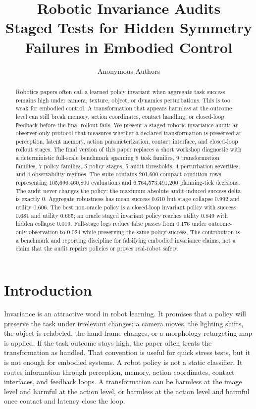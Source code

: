 \documentclass{article}
\title{Robotic Invariance Audits\\Staged Tests for Hidden Symmetry Failures in Embodied Control}
\author{Anonymous Authors}
\begin{document}
\maketitle

\begin{abstract}
Robotics papers often call a learned policy invariant when aggregate task success remains high under camera, texture, object, or dynamics perturbations. This is too weak for embodied control. A transformation that appears harmless at the outcome level can still break memory, action coordinates, contact handling, or closed-loop feedback before the final rollout fails. We present a staged robotic invariance audit: an observer-only protocol that measures whether a declared transformation is preserved at perception, latent memory, action parameterization, contact interface, and closed-loop rollout stages. The final version of this paper replaces a short workshop diagnostic with a deterministic full-scale benchmark spanning 8 task families, 9 transformation families, 7 policy families, 5 policy stages, 5 audit thresholds, 4 perturbation severities, and 4 observability regimes. The suite contains 201,600 compact condition rows representing 105,696,460,800 evaluations and 6,764,573,491,200 planning-tick decisions. The audit never changes the policy: the maximum absolute audit-induced success delta is exactly 0. Aggregate robustness has mean success 0.610 but stage collapse 0.992 and utility 0.606. The best non-oracle policy is a closed-loop invariant policy with success 0.681 and utility 0.665; an oracle staged invariant policy reaches utility 0.849 with hidden collapse 0.019. Full-stage logs reduce false passes from 0.176 under outcome-only observation to 0.024 while preserving the same policy success. The contribution is a benchmark and reporting discipline for falsifying embodied invariance claims, not a claim that the audit repairs policies or proves real-robot safety.
\end{abstract}

\section{Introduction}

Invariance is an attractive word in robot learning. It promises that a policy will preserve the task under irrelevant changes: a camera moves, the lighting shifts, the object is relabeled, the hand frame changes, or a morphology retargeting map is applied. If the task outcome stays high, the paper often treats the transformation as handled. That convention is useful for quick stress tests, but it is not enough for embodied systems. A robot policy is not a static classifier. It routes information through perception, memory, action coordinates, contact interfaces, and feedback loops. A transformation can be harmless at the image level and harmful at the action level, or harmless at the action level and harmful once contact and latency close the loop.
\end{document}
